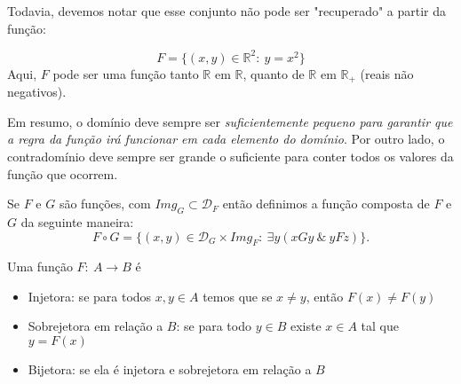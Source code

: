          Todavia, devemos notar que esse conjunto não pode ser "recuperado" a partir da função:
         \begin{exmp}
            $$F = \{( x, y ) \in \mathbb{R}^{2}:\ y = x^{2}\}$$
            Aqui, $F$ pode ser uma função tanto $\mathbb{R}$ em $\mathbb{R}$, quanto de $\mathbb{R}$ em $\mathbb{R}_{+}$ (reais não negativos).
         \end{exmp}
         Em resumo, o domínio deve sempre ser \emph{suficientemente pequeno para garantir que a regra da função irá funcionar em cada elemento do domínio}. Por outro lado, o contradomínio deve sempre ser grande o suficiente para conter todos os valores da função que ocorrem.
         \begin{definition}[Composta]
            Se $F$ e $G$ são funções, com $\mathit{Img}_{G} \subset \mathcal{D}_{F}$ então definimos a função composta de $F$ e $G$ da seguinte maneira:
            $$ F \circ G = \{( x, y ) \in \mathcal{D}_{G} \times \mathit{Img}_{F}:\ \exists y (xGy\ \&\ yFz)\}.$$  
         \end{definition}
         \begin{center}
         \end{center}
         \begin{definition}[Natureza]
            Uma função $F:\ A \longrightarrow B$ é
         \end{definition}
         \begin{itemize}
            \item Injetora: se para todos $x, y \in A$ temos que se $x \neq y$, então $F(x) \neq F(y)$
            \item Sobrejetora em relação a $B$: se para todo $y \in B$ existe $x \in A$ tal que $y = F(x)$
            \item Bijetora: se ela é injetora e sobrejetora em relação a $B$
         \end{itemize}
